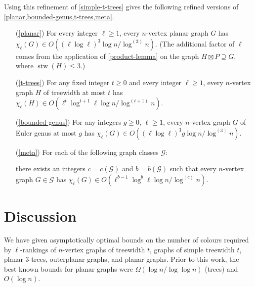 \documentclass[kpfonts]{patmorin}
\DeclareMathOperator{\stw}{stw}
\newcommand{\lrn}{\chi_{\ell}}
\theoremstyle{named}
\begin{document}
Using this refinement of \cref{simple-t-trees} gives the following refined versions of \cref{planar,bounded-genus,t-trees,meta}.
\begin{itemize}
    \item[(\ref{planar})] For every integer $\ell\ge 1$, every $n$-vertex planar graph $G$ has $\lrn(G)\in O((\ell\log \ell)^3\log n/\log^{(3)} n)$. (The additional factor of $\ell$ comes from the application of \cref{product-lemma} on the graph $H\boxtimes P\supseteq G$, where $\stw(H)\le 3$.)

    \item[(\ref{t-trees})] For any fixed integer $t\ge 0$ and every integer $\ell\ge 1$, every $n$-vertex graph $H$ of treewidth at most $t$ has $\lrn(H)\in O(\ell^t\log^{t+1}\ell \log n/\log^{(t+1)}n)$.

    \item[(\ref{bounded-genus})] For any integers $g\ge 0$, $\ell\ge 1$, every  $n$-vertex graph $G$ of Euler genus at most $g$ has $\lrn(G)\in O((\ell\log \ell)^3 g\log n/\log^{(3)} n)$.

    \item[(\ref{meta})] For each of the following graph classes $\mathcal{G}$:
    there exists an integers $c=c(\mathcal{G})$ and $b=b(\mathcal{G})$ such that every $n$-vertex graph $G\in\mathcal{G}$ has $\lrn(G)\in O(\ell^{b-1}\log^b\ell\log n/\log^{(c)} n)$.
\end{itemize}










\section{Discussion}
\label{conclusion}

We have given asymptotically optimal bounds on the number of colours required by $\ell$-rankings of $n$-vertex graphs of treewidth $t$, graphs of simple treewidth $t$, planar 3-trees, outerplanar graphs, and planar graphs.  Prior to this work, the best known bounds for planar graphs were $\Omega(\log n/\log\log n)$ (trees) and $O(\log n)$.
\end{document}
